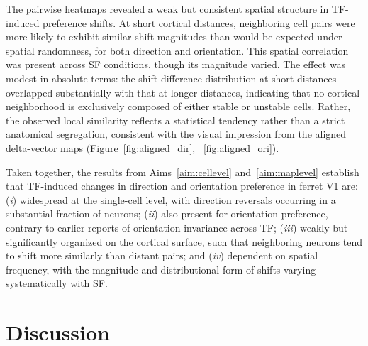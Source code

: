 \documentclass{brandeis-thesis3.3}
\begin{document}
The pairwise heatmaps revealed a weak but consistent spatial
structure in TF-induced preference shifts. At short cortical
distances, neighboring cell pairs were more likely to exhibit
similar shift magnitudes than would be expected under spatial
randomness, for both direction and orientation. This spatial
correlation was present across SF conditions, though its
magnitude varied. The effect was modest in absolute terms: the
shift-difference distribution at short distances overlapped
substantially with that at longer distances, indicating that
no cortical neighborhood is exclusively composed of either stable
or unstable cells. Rather, the observed local similarity reflects
a statistical tendency rather than a strict anatomical
segregation, consistent with the visual impression from the
aligned delta-vector maps (Figure~\ref{fig:aligned_dir}, ~\ref{fig:aligned_ori}).

Taken together, the results from Aims~\ref{aim:cellevel}
and~\ref{aim:maplevel} establish that TF-induced changes in
direction and orientation preference in ferret V1 are:
(\textit{i}) widespread at the single-cell level, with direction
reversals occurring in a substantial fraction of neurons;
(\textit{ii}) also present for orientation preference, contrary
to earlier reports of orientation invariance across TF;
(\textit{iii}) weakly but significantly organized on the cortical
surface, such that neighboring neurons tend to shift more
similarly than distant pairs; and (\textit{iv}) dependent on
spatial frequency, with the magnitude and distributional form of
shifts varying systematically with SF.


\chapter{Discussion}
\end{document}
